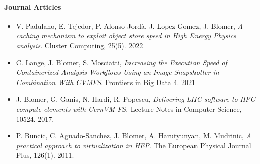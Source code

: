 \paragraph{Journal Articles}

\begin{itemize}

\item[] V. Padulano, E. Tejedor, P. Alonso-Jordà, J. Lopez Gomez, J. Blomer,
\emph{A caching mechanism to exploit object store speed in High Energy Physics analysis}.
Cluster Computing, 25(5). 2022

\item[] C. Lange, J. Blomer, S. Mosciatti, \emph{Increasing the Execution Speed of Containerized Analysis Workflows Using an Image
Snapshotter in Combination With CVMFS}. Frontiers in Big Data 4. 2021

\item[] J. Blomer, G. Ganis, N. Hardi, R. Popescu, \emph{Delivering LHC software to HPC compute elements with CernVM-FS}.
Lecture Notes in Computer Science, 10524. 2017.

\item[] P. Buncic, C. Aguado-Sanchez, J. Blomer, A. Harutyunyan, M. Mudrinic,
\emph{A practical approach to virtualization in HEP}.
The European Physical Journal Plus, 126(1). 2011.

\end{itemize}
